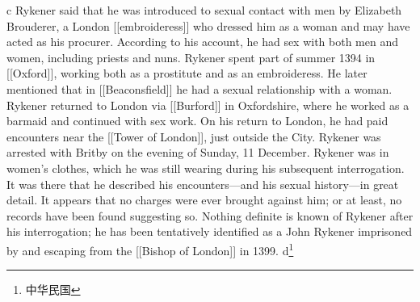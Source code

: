 \documentclass[11pt,a4paper,oneside]{article}
\begin{document}
c\cite{hall1968effect}
\newpage
Rykener said that he was introduced to sexual contact with men by Elizabeth Brouderer, a London [[embroideress]] who dressed him as a woman and may have acted as his procurer. According to his account, he had sex with both men and women, including priests and nuns. Rykener spent part of summer 1394 in [[Oxford]], working both as a prostitute and as an embroideress. He later mentioned that in [[Beaconsfield]] he had a sexual relationship with a woman. Rykener returned to London via [[Burford]] in Oxfordshire, where he worked as a barmaid and continued with sex work. On his return to London, he had paid encounters near the [[Tower of London]], just outside the City. Rykener was arrested with Britby on the evening of Sunday, 11 December. Rykener was in women's clothes, which he was still wearing during his subsequent interrogation. It was there that he described his encounters—and his sexual history—in great detail. It appears that no charges were ever brought against him; or at least, no records have been found suggesting so. Nothing definite is known of Rykener after his interrogation; he has been tentatively identified as a John Rykener imprisoned by and escaping from the [[Bishop of London]] in 1399.
\newpage
d\footnote{中华民国}
\end{document}
